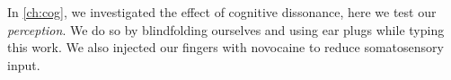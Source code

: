 
In \autoref{ch:cog}, we investigated the effect of cognitive dissonance, here we test our \emph{perception}. We do so by blindfolding ourselves and using ear plugs while typing this work. We also injected our fingers with novocaine to reduce somatosensory input.
